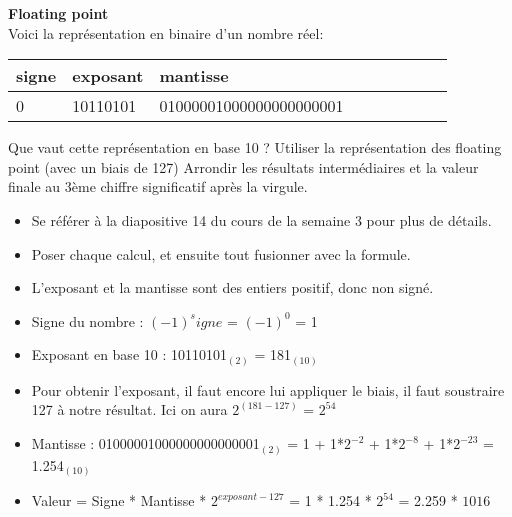 \begin{Exercice}[10 minutes] \textbf{Floating point}\\
    
    Voici la représentation en binaire d'un nombre réel: \\
    
     \begin{tabular}{| p{1cm} | p{3cm} | p{9.5cm} | p{1cm} | p{1cm} | p{1cm} | p{1cm} | p{1cm} | p{1cm} |} 
            \hline
            signe & exposant & mantisse \\ [0.5ex] 
            \hline
            0 & 10110101 & 01000001000000000000001 \\ [0.5ex]
            \hline
	\end{tabular}
	
	Que vaut cette représentation en base 10 ? Utiliser la représentation des floating point (avec un biais de 127) Arrondir les résultats intermédiaires et la valeur finale au 3ème chiffre significatif après la virgule. \\
	
    \begin{conseil}
    
    \begin{itemize}
    	\item Se référer à la diapositive 14 du cours de la semaine 3 pour plus de détails.
    	\item Poser chaque calcul, et ensuite tout fusionner avec la formule.
    	\item L'exposant et la mantisse sont des entiers positif, donc non signé.
    \end{itemize}
    
    \end{conseil}
    
    \begin{solution}
        \begin{itemize}
        	\item Signe du nombre : $(-1)^signe$ = $(-1)^0$ = 1
        	\item Exposant en base 10 : 10110101$_{(2)}$ = 181$_{(10)}$
        	\item Pour obtenir l'exposant, il faut encore lui appliquer le biais, il faut soustraire 127 à notre résultat. Ici on aura $2^{(181-127)}$ = $2^{54}$
        	\item Mantisse : 01000001000000000000001$_{(2)}$ = 1 + 1*$2^{-2}$ + 1*$2^{-8}$ + 1*$2^{-23}$ = 1.254$_{(10)}$
        	\item Valeur = Signe * Mantisse * $2^{exposant-127}$ = 1 * 1.254 * $2^{54}$ = 2.259 * $10{16}$
        \end{itemize}
    \end{solution}
\end{Exercice}

